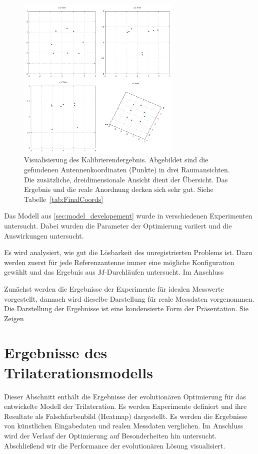 \begin{figure}[ht!]
         \centering
         \includegraphics[width=0.7\textwidth]{img/calibration/calibration_results.png}
         \caption[Visualisierung des Kalibrierendergebnis]{Visualisierung des Kalibrierendergebnis. Abgebildet sind die gefundenen Antennenkoordinaten (Punkte) in drei Raumansichten. Die zusätzliche, dreidimensionale  Ansicht dient der Übersicht. Das Ergebnis und die reale Anordnung decken sich sehr gut. Siehe Tabelle~\ref{tab:FinalCoords}}
         \label{fig:3dplot_coordinates}
%
\end{figure}

Das Modell aus \ref{sec:model_developement} wurde in verschiedenen Experimenten untersucht. Dabei wurden die Parameter der Optimierung variiert und die Auswirkungen untersucht.

Es wird analysiert, wie gut die Lösbarkeit des unregistrierten Problems ist. Dazu werden zuerst für jede Referenzantenne immer eine mögliche Konfiguration gewählt und das Ergebnis aus $M$-Durchläufen untersucht. Im Anschluss %

Zunächst werden die Ergebnisse der Experimente für idealen Messwerte vorgestellt, dannach wird dieselbe Darstellung für reale Messdaten vorgenommen. Die Darstellung der Ergebnisse ist eine kondensierte Form der Präsentation. Sie Zeigen 
%
%
\section{Ergebnisse des Trilaterationsmodells}
%
\label{sec:Results1}
%
Dieser Abschnitt enthält die Ergebnisse der evolutionären Optimierung für das entwickelte Modell der Trilateration. Es werden Experimente definiert und ihre Resultate als Falschfarbenbild (Heatmap) dargestellt. Es werden die Ergebnisse von künstlichen Eingabedaten und realen Messdaten verglichen. Im Anschluss wird der Verlauf der Optimierung auf Besonderheiten hin untersucht. Abschließend wir die Performance der evolutionären Lösung visualisiert.
%
